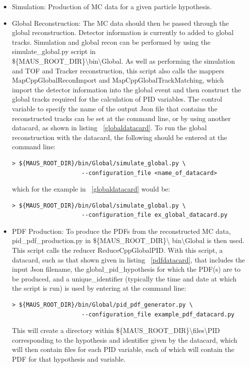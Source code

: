 \begin{itemize}
\item Simulation: Production of MC data for a given particle 
hypothesis.
\item Global Reconstruction: The MC data should then be passed through 
the global reconstruction. Detector information is currently to added to global tracks. Simulation and global recon can be performed 
by using the simulate\_global.py script in \\
\$\{MAUS\_ROOT\_DIR\}\textbackslash bin\textbackslash Global. As well as performing the simulation
 and TOF and Tracker reconstruction, this script also calls the mappers  
MapCppGlobalReconImport and MapCppGlobalTrackMatching, which import the detector 
information into the global event and then construct the global tracks required 
for the calculation of PID variables. The control variable to specify 
the name of the output Json file that contains the reconstructed tracks can be set at the command line, or by 
using another datacard, as shown in listing ~\ref{globaldatacard}. To run 
the global reconstruction with the datacard, the following should be entered at the command line:


\begin{verbatim}
> ${MAUS_ROOT_DIR}/bin/Global/simulate_global.py \
                    --configuration_file <name_of_datacard>
\end{verbatim}

which for the example in ~\ref{globaldatacard} would be:

\begin{verbatim}
> ${MAUS_ROOT_DIR}/bin/Global/simulate_global.py \
                    --configuration_file ex_global_datacard.py
\end{verbatim}

\item PDF Production: To produce the PDFs from the reconstructed MC 
data, pid\_pdf\_production.py in \$\{MAUS\_ROOT\_DIR\}\textbackslash 
bin\textbackslash Global is then used. This script calls the reducer 
ReduceCppGlobalPID. With this script, a datacard, such as that shown 
given in listing ~\ref{pdfdatacard}, that includes the input Json filename, the global\_pid\_hypothesis for which the PDF(s) are to be produced, and a unique\_identifier (typically the time and date at which the script is run) is used by entering at the command line:
\begin{verbatim}
> ${MAUS_ROOT_DIR}/bin/Global/pid_pdf_generator.py \
                    --configuration_file example_pdf_datacard.py
\end{verbatim}
This will create a directory within \$\{MAUS\_ROOT\_DIR\}\textbackslash files\textbackslash PID corresponding to the hypothesis and identifier given by the datacard, which will then contain files for each PID variable, each of which will contain the PDF for that hypothesis and variable.
\end{itemize}

